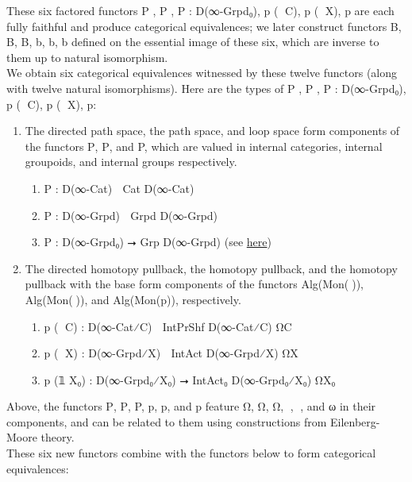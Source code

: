 \documentclass{book}
\theoremstyle{definition}
\begin{document}
These six factored functors P⃗ , P⃡ , P : D(∞-Grpd₀), p⃗ (𝟙 C), p⃡ (𝟙 X), p are each fully faithful and produce categorical equivalences; we later construct functors B⃗, B⃡, B, b⃗, b⃡, b defined on the essential image of these six, which are inverse to them up to natural isomorphism.\\

We obtain six categorical equivalences witnessed by these twelve functors (along with twelve natural isomorphisms). Here are the types of P⃗ , P⃡ , P : D(∞-Grpd₀), p⃗ (𝟙 C), p⃡ (𝟙 X), p:

\begin{enumerate}
\item The directed path space, the path space, and loop space form components of the functors P⃗, P⃡, and P, which are valued in internal categories, internal groupoids, and internal groups respectively.
\begin{enumerate}
\item P⃗ : D(∞-Cat) ⭢ Cat D(∞-Cat)
\item P⃡ : D(∞-Grpd) ⭢ Grpd D(∞-Grpd)
\item P : D(∞-Grpd₀) ⭢ Grp D(∞-Grpd) (see \href{https://mathoverflow.net/questions/128883/why-omega-x-and-bg-are-adjoint-functors}{here})
\end{enumerate}
\item The directed homotopy pullback, the homotopy pullback, and the homotopy pullback with the base form components of the functors Alg(Mon(ω⃗)), Alg(Mon(ω⃡)), and Alg(Mon(p)), respectively. 
\begin{enumerate}
\item p⃗ (𝟙 C) : D(∞-Cat⁄C) ⭢ IntPrShf D(∞-Cat⁄C) Ω⃗C 
\item p⃡ (𝟙 X) : D(∞-Grpd⁄X) ⭢ IntAct D(∞-Grpd⁄X) Ω⃡X
\item p (𝟙 X₀) : D(∞-Grpd₀⁄X₀) ⭢ IntAct₀ D(∞-Grpd₀⁄X₀) ΩX₀
\end{enumerate}
\end{enumerate}

Above, the functors P⃗, P⃡, P, p⃗, p⃡, and p feature Ω⃗, Ω⃡, Ω, ω⃗, ω⃡, and ω in their components, and can be related to them using constructions from Eilenberg-Moore theory.\\

These six new functors combine with the functors below to form categorical equivalences:\\
\end{document}
